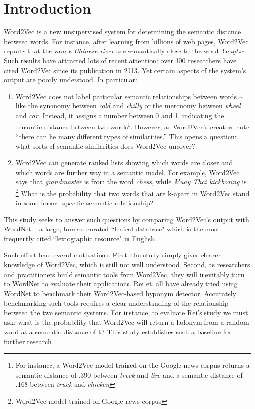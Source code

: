 \documentclass[titlepage]{article}
\begin{document}
\renewcommand{\thepage}{\arabic{page}}
\section{Introduction}

Word2Vec is a new unsupervised system for determining the semantic distance between words. For instance, after learning from billions of web pages, Word2Vec reports that the words \textit{Chinese river} are semantically close to the word \textit{Yangtze}. \cite{Word2VecWebsite} Such results have attracted lots of recent attention: over 100 researchers have cited Word2Vec since its publication in 2013. Yet certain aspects of the system's output are poorly understood. In particular: 

\begin{enumerate}
\item Word2Vec does not label particular semantic relationships between words -- like the synonomy between \textit{cold} and \textit{chilly} or the meronomy between \textit{wheel} and \textit{car}. Instead, it assigns a number between 0 and 1, indicating the semantic distance between two words\footnote{For instance, a Word2Vec model trained on the Google news corpus returns a semantic distance of .390 between \textit{truck} and \textit{tire} and a semantic distance of .168 between \textit{truck} and \textit{chicken}}. However, as Word2Vec’s creators note ``there can be many different types of similarities.” \cite{mikolov2013efficient} This opens a question: what sorts of semantic similarities does Word2Vec uncover?

\item Word2Vec can generate ranked lists showing which words are closer and which words are further way in a semantic model. For example, Word2Vec says that \textit{grandmaster} is  from the word \textit{chess}, while \textit{Muay Thai kickboxing} is . \footnote{Word2Vec model trained on Google news corpus} What is the probability that two words that are k-apart in Word2Vec stand in some formal specific semantic relationship?
\end{enumerate}

This study seeks to answer such questions by comparing Word2Vec's output with WordNet -- a large, human-curated ``lexical database" \cite{Wordnetwebsite} which is the most-frequently cited ``lexiographic resource" \cite{widdows} in English. 

Such effort has several motivations. First, the study simply gives clearer knowledge of Word2Vec, which is still not well understood. Second, as researchers and practitioners build semantic tools from Word2Vec, they will inevitably turn to WordNet to evaluate their applications. Rei et. all \cite{rei2014looking} have already tried using WordNet to benchmark their Word2Vec-based hyponym detector. Accurately benchmarking such tools requires a clear understanding of the relationship between the two semantic systems. For instance, to evaluate Rei's study we must ask: what is the probability that Word2Vec will return a holonym from a random word at a semantic distance of k? This study establishes such a baseline for further research. 
\end{document}
